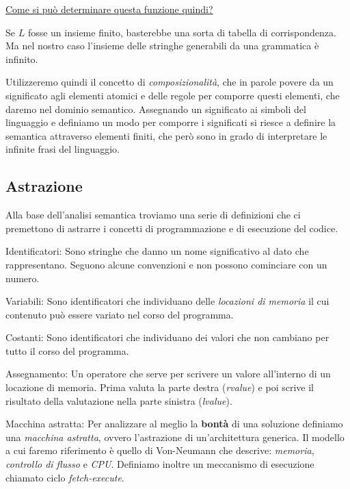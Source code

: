 \documentclass{article}
\begin{document}
\vspace{.5cm}

\noindent\underline{Come si può determinare questa funzione quindi?}

Se \(L\) fosse un insieme finito, basterebbe una sorta di tabella di corrispondenza. Ma nel nostro caso l'insieme delle stringhe generabili da una grammatica è infinito.

Utilizzeremo quindi il concetto di \emph{composizionalità}, che in parole povere da un significato agli elementi atomici e delle regole per comporre questi elementi, che daremo nel dominio semantico. Assegnando un significato ai simboli del linguaggio e definiamo un modo per comporre i significati si riesce a definire la semantica attraverso elementi finiti, che però sono in grado di interpretare le infinite frasi del linguaggio.

\subsection{Astrazione}
Alla base dell'analisi semantica troviamo una serie di definizioni che ci premettono di astrarre i concetti di programmazione e di esecuzione del codice.

\begin{dfn}{Identificatori: }
    Sono stringhe che danno un nome significativo al dato che rappresentano.
    Seguono alcune convenzioni e non possono cominciare con un numero.
\end{dfn}

\begin{dfn}{Variabili: }
    Sono identificatori che individuano delle \emph{locazioni di memoria} il cui contenuto può essere variato nel corso del programma.
\end{dfn}
\begin{dfn}{Costanti: }
    Sono identificatori che individuano dei valori che non cambiano per tutto il corso del programma.
\end{dfn}

\begin{dfn}{Assegnamento: }
    Un operatore che serve per scrivere un valore all'interno di un locazione di memoria. Prima valuta la parte destra (\emph{rvalue}) e poi scrive il risultato della valutazione nella parte sinistra (\emph{lvalue}).
\end{dfn}

\begin{dfn}{Macchina astratta: }
    Per analizzare al meglio la \textbf{bontà} di una soluzione definiamo una \emph{macchina astratta}, ovvero l'astra\-zione di un'architettura generica. Il modello a cui faremo riferimento è quello di Von-Neumann che descrive: \emph{memoria}, \emph{controllo di flusso} e \emph{CPU}.
    Definiamo inoltre un meccanismo di esecuzione chiamato ciclo \emph{fetch-execute}.
\end{dfn}
\end{document}
